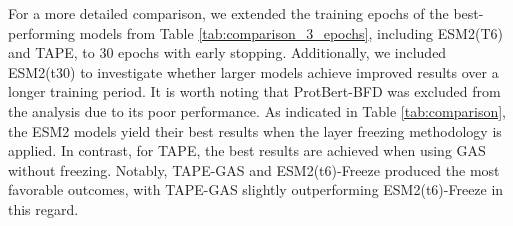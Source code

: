 For a more detailed comparison, we extended the training epochs of the best-performing models from Table \ref{tab:comparison_3_epochs}, including ESM2(T6) and TAPE, to 30 epochs with early stopping. Additionally, we included ESM2(t30) to investigate whether larger models achieve improved results over a longer training period. It is worth noting that ProtBert-BFD was excluded from the analysis due to its poor performance. As indicated in Table \ref{tab:comparison}, the ESM2 models yield their best results when the layer freezing methodology is applied. In contrast, for TAPE, the best results are achieved when using GAS without freezing. Notably, TAPE-GAS and ESM2(t6)-Freeze produced the most favorable outcomes, with TAPE-GAS slightly outperforming ESM2(t6)-Freeze in this regard.




